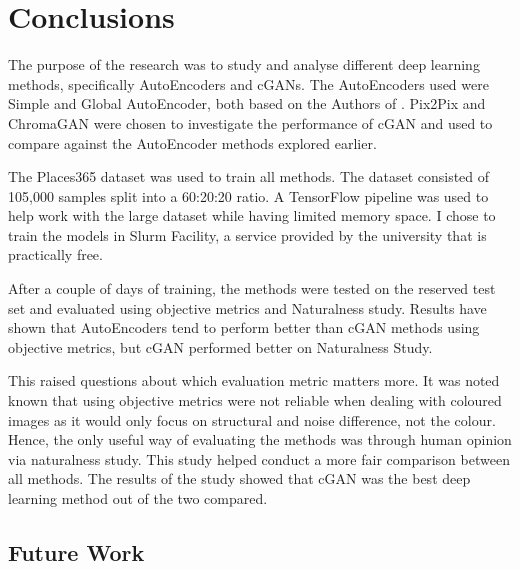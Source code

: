 \chapter{Conclusions}
The purpose of the research was to study and analyse different deep learning methods, specifically AutoEncoders and cGANs. The AutoEncoders used were Simple and Global AutoEncoder, both based on the Authors of \cite{deepkoal2017}. Pix2Pix and ChromaGAN were chosen to investigate the performance of cGAN and used to compare against the AutoEncoder methods explored earlier. 

The Places365 dataset was used to train all methods. The dataset consisted of 105,000 samples split into a 60:20:20 ratio. A TensorFlow pipeline was used to help work with the large dataset while having limited memory space. I chose to train the models in Slurm Facility, a service provided by the university that is practically free. 

After a couple of days of training, the methods were tested on the reserved test set and evaluated using objective metrics and Naturalness study. Results have shown that AutoEncoders tend to perform better than cGAN methods using objective metrics, but cGAN performed better on Naturalness Study. 

This raised questions about which evaluation metric matters more. It was noted known that using objective metrics were not reliable when dealing with coloured images as it would only focus on structural and noise difference, not the colour. Hence, the only useful way of evaluating the methods was through human opinion via naturalness study. This study helped conduct a more fair comparison between all methods. The results of the study showed that cGAN was the best deep learning method out of the two compared.









\section{Future Work}
